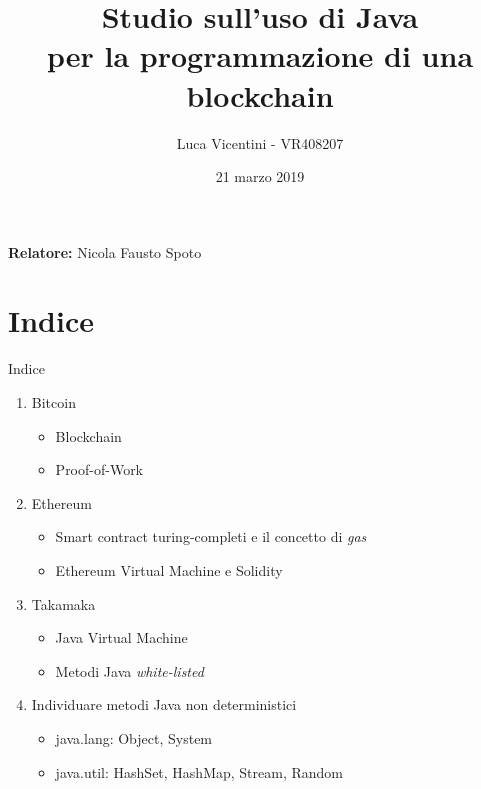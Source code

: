 \documentclass[]{beamer}
\title{Studio sull'uso di Java \\per la programmazione di una blockchain }
\author{Luca Vicentini - VR408207}
\date{21 marzo 2019}
\begin{document}
\begin{frame}
  \titlepage
  \begin{center}
  	\textbf{Relatore:} Nicola Fausto Spoto
  \end{center}
\end{frame}
                           
\section{Indice}
\begin{frame}{Indice}
	\begin{enumerate}
		\item Bitcoin
			\begin{itemize}
				\item Blockchain
				\item Proof-of-Work
			\end{itemize}
		\item Ethereum
			\begin{itemize}
				\item Smart contract turing-completi e il concetto di \textit{gas}
				\item Ethereum Virtual Machine e Solidity
			\end{itemize}
		\item Takamaka
			\begin{itemize}
				\item Java Virtual Machine
				\item Metodi Java \textit{white-listed}
			\end{itemize}
		\item Individuare metodi Java non deterministici
			\begin{itemize}
				\item java.lang: Object, System
				\item java.util: HashSet, HashMap, Stream, Random
			\end{itemize}
	\end{enumerate}
\end{frame}

\end{document}
